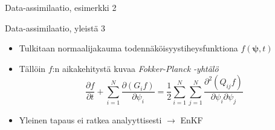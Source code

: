 \documentclass{beamer}
\begin{document}
\begin{frame}{Data-assimilaatio, esimerkki 2}

\begin{figure}
\end{figure}

\end{frame}

\begin{frame}{Data-assimilaatio, yleistä 3}

\begin{itemize}
\item Tulkitaan normaalijakauma todennäköisyystiheysfunktiona $f(\boldsymbol{\psi},t)$
\item Tällöin $f$:n aikakehitystä kuvaa \emph{Fokker-Planck -yhtälö}
\[
\frac{\partial f}{\partial t} + \sum_{i=1}^N \frac{\partial \left ( G_i f \right )}{\partial \psi_i} = \frac{1}{2} \sum_{i=1}^N \sum_{j=1}^N \frac{\partial^2 \left ( Q_{ij} f \right )}{\partial \psi_i \partial \psi_j}
\]
\item Yleinen tapaus ei ratkea analyyttisesti $\rightarrow$ EnKF
\end{itemize}

\end{frame}
\end{document}
